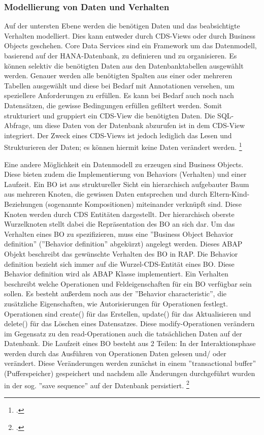 \subsubsection{Modellierung von Daten und Verhalten}

Auf der untersten Ebene werden die benötigen Daten und das beabsichtigte Verhalten modelliert. Dies kann entweder durch CDS-Views oder durch Business Objects geschehen. Core Data Services sind ein Framework um das Datenmodell, basierend auf der HANA-Datenbank, zu definieren und zu organisieren. Es können selektiv die benötigten Daten aus den Datenbanktabellen ausgewählt werden. Genauer werden alle benötigten Spalten aus einer oder mehreren Tabellen ausgewählt und diese bei Bedarf mit Annotationen versehen, um speziellere Anforderungen zu erfüllen. Es kann bei Bedarf auch noch nach Datensätzen, die gewisse Bedingungen erfüllen gefiltert werden. Somit strukturiert und gruppiert ein CDS-View die benötigten Daten. Die SQL-Abfrage, um diese Daten von der Datenbank abzurufen ist in dem CDS-View integriert. Der Zweck eines CDS-Views ist jedoch lediglich das Lesen und Strukturieren der Daten; es können hiermit keine Daten verändert werden. \footcite[Vgl.][]{sap_rap_2023}

Eine andere Möglichkeit ein Datenmodell zu erzeugen sind Business Objects. Diese bieten zudem die Implementierung von Behaviors (Verhalten) und einer Laufzeit. Ein BO ist aus struktureller Sicht ein hierarchisch aufgebauter Baum aus mehreren Knoten, die gewissen Daten entsprechen und durch Eltern-Kind-Beziehungen (sogenannte Kompositionen) miteinander verknüpft sind. Diese Knoten werden durch CDS Entitäten dargestellt. Der hierarchisch oberste Wurzelknoten stellt dabei die Repräsentation des BO an sich dar. Um das Verhalten eines BO zu spezifizieren, muss eine ''Business Object Behavior definition'' (''Behavior definition'' abgekürzt) angelegt werden. Dieses ABAP Objekt beschreibt das gewünschte Verhalten des BO in RAP. Die Behavior definition bezieht sich immer auf die Wurzel-CDS-Entität eines BO. Diese Behavior definition wird als ABAP Klasse implementiert. Ein Verhalten beschreibt welche Operationen und Feldeigenschaften für ein BO verfügbar sein sollen. Es besteht au{\ss}erdem noch aus der ''Behavior characteristic'', die zusätzliche Eigenschaften, wie \zB Autorisierungen für Operationen festlegt. Operationen sind \zB create() für das Erstellen, update() für das Aktualisieren und delete() für das Löschen eines Datensatzes. Diese modify-Operationen verändern im Gegensatz zu den read-Operationen auch die tatsächlichen Daten auf der Datenbank. Die Laufzeit eines BO besteht aus 2 Teilen: In der Interaktionsphase werden durch das Ausführen von Operationen Daten gelesen und/ oder verändert. Diese Veränderungen werden zunächst in einem ''transactional buffer'' (Pufferspeicher) gespeichert und nachdem alle Änderungen durchgeführt wurden in der sog. ''save sequence'' auf der Datenbank persistiert. \footcite[Vgl.][]{sap_rap_2023}

